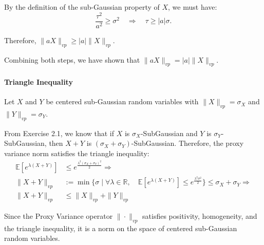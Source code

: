 \documentclass[a4 paper]{article}
\numberwithin{equation}{section}
\theoremstyle{boldStyle}
\theoremstyle{boldBlueStyle}
\theoremstyle{boldPurpleStyle}
\theoremstyle{boldRedStyle}
\begin{document}
\begin{enumerate}
By the definition of the sub-Gaussian property of \(X\), we must have:
\[
\frac{\tau^2}{a^2} \geq \sigma^2 \quad \Rightarrow \quad \tau \geq |a| \sigma.
\]

Therefore, $\|aX\|_{vp} \geq |a| \|X\|_{vp}$.

Combining both steps, we have shown that \(\|aX\|_{vp} = |a| \|X\|_{vp}\).



\paragraph{Triangle Inequality}
Let \(X\) and \(Y\) be centered sub-Gaussian random variables with \(\|X\|_{vp} = \sigma_X\) and \(\|Y\|_{vp} = \sigma_Y\). 

From Exercise 2.1, we know that if \(X\) is \(\sigma_X\)-SubGaussian and \(Y\) is \(\sigma_Y\)-SubGaussian, 
then \(X + Y\) is \((\sigma_X + \sigma_Y)\)-SubGaussian. Therefore, the proxy variance norm satisfies the triangle inequality:
\begin{align*}
\mathbb{E}\left[e^{\lambda (X + Y)}\right] &\leq e^{\frac{\lambda^2 (\sigma_X + \sigma_Y)^2}{2} }  \Rightarrow \\
\|X + Y\|_{vp} &:= \min\{\sigma \mid \forall \lambda \in \mathbb{R}, \quad \mathbb{E}\left[e^{\lambda (X + Y)}\right] \leq e^{\frac{\lambda^2 \sigma^2}{2}}\} \leq \sigma_X + \sigma_Y \Rightarrow \\
\|X + Y\|_{vp} &\leq \|X\|_{vp} + \|Y\|_{vp}
\end{align*}

\bigbreak


Since the Proxy Variance operator \(\|\cdot\|_{vp}\) satisfies positivity, homogeneity, and the triangle inequality, it is a norm on the space of centered sub-Gaussian random variables.











\end{enumerate}

\newpage
\end{document}
